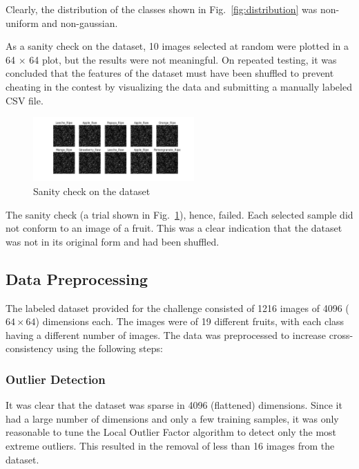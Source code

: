 \documentclass[conference]{IEEEtran}
\begin{document}
    Clearly, the distribution of the classes shown in Fig.~\ref{fig:distribution} was non-uniform and non-gaussian.

    As a sanity check on the dataset, 10 images selected at random were plotted in a 64 $\times$ 64 plot, but the results were not meaningful.
    On repeated testing, it was concluded that the features of the dataset must have been shuffled to prevent cheating in the contest by visualizing
    the data and submitting a manually labeled CSV file.

    \begin{figure}[htbp]
        \centerline{\includegraphics[width=0.55\textwidth]{Assets/sanity-check.png}}
        \caption{Sanity check on the dataset}
        \label{fig:sanitycheck}
    \end{figure}

    The sanity check (a trial shown in Fig.~\ref{fig:sanitycheck}), hence, failed.
    Each selected sample did not conform to an image of a fruit.
    This was a clear indication that the dataset was not in its original form and had been shuffled.

    \subsection{Data Preprocessing}
    \label{sec:dataprep}
    The labeled dataset provided for the challenge consisted of 1216 images of 4096 ($64 \times 64$) dimensions each.
    The images were of 19 different fruits, with each class having a different number of images.
    The data was preprocessed to increase cross-consistency using the following steps:

    \subsubsection{Outlier Detection}
    \label{sec:outlierdetection}
    It was clear that the dataset was sparse in 4096 (flattened) dimensions.
    Since it had a large number of dimensions and only a few training samples, it was only reasonable to tune the
    Local Outlier Factor algorithm to detect only the most extreme outliers.
    This resulted in the removal of less than 16 images from the dataset.
\end{document}
